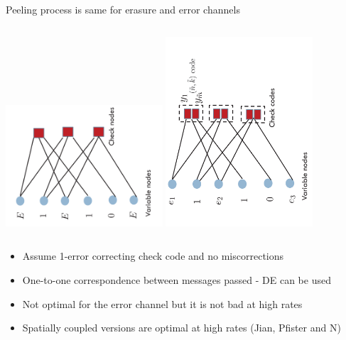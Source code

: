 \begin{frame}{Peeling process is same for erasure and error channels}
\begin{columns}
\includegraphics[width=2.3in,angle=-90]{./Figures/Tannergraph63codewitherasures}
\includegraphics[width=2.15in,angle=-90]{./Figures/GLDPC}
\end{columns}
\begin{block}{}
\begin{itemize}
  \item Assume 1-error correcting check code and no miscorrections
  \item One-to-one correspondence between messages passed - DE can be used
  \item Not optimal for the error channel but it is not bad at high rates
  \item Spatially coupled versions are optimal at high rates (Jian, Pfister and N)
\end{itemize}
\end{block}
\end{frame}
